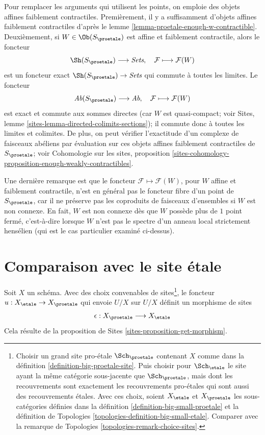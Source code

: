 \medskip\noindent
Pour remplacer les arguments qui utilisent les points, on emploie des objets affines
faiblement contractiles.
Premièrement, il y a suffisamment d'objets affines faiblement contractiles d'après le
lemme \ref{lemma-proetale-enough-w-contractible}.
Deuxièmement, si $W \in \Ob(S_\proetale)$ est affine et faiblement contractile,
alors le foncteur
$$
\Sh(S_\proetale) \longrightarrow \textit{Sets},\quad
\mathcal{F} \longmapsto \mathcal{F}(W)
$$
est un foncteur exact $\Sh(S_\proetale) \to \textit{Sets}$ qui commute
à toutes les limites. Le foncteur
$$
\textit{Ab}(S_\proetale) \longrightarrow \textit{Ab},\quad
\mathcal{F} \longmapsto \mathcal{F}(W)
$$
est exact et commute aux sommes directes (car $W$ est quasi-compact; voir
Sites, lemme \ref{sites-lemma-directed-colimits-sections}); il
commute donc à toutes les limites et colimites. De plus, on peut vérifier l'exactitude d'un
complexe de faisceaux abéliens par évaluation sur ces objets affines
faiblement contractiles de $S_\proetale$; voir
Cohomologie sur les sites, proposition
\ref{sites-cohomology-proposition-enough-weakly-contractibles}.

\medskip\noindent
Une dernière remarque est que le foncteur $\mathcal{F} \mapsto \mathcal{F}(W)$,
pour $W$ affine et faiblement contractile, n'est en général pas le foncteur fibre d'un
point de $S_\proetale$, car il ne préserve pas les coproduits de faisceaux
d'ensembles si $W$ est non connexe. En fait, $W$ est non connexe dès que $W$
possède plus de $1$ point fermé, c'est-à-dire lorsque $W$ n'est pas le spectre d'un
anneau local strictement hensélien (qui est le cas particulier examiné ci-dessus).





\section{Comparaison avec le site \'etale}
\label{section-comparison}

\noindent
Soit $X$ un schéma. Avec des choix convenables de sites\footnote{Choisir
un grand site pro-\'etale $\Sch_\proetale$ contenant $X$ comme dans la
définition \ref{definition-big-proetale-site}. Puis choisir pour $\Sch_\etale$
le site ayant la même catégorie sous-jacente que $\Sch_\proetale$, mais
dont les recouvrements sont exactement les recouvrements pro-\'etales qui sont aussi des
recouvrements \'etales. Avec ces choix, soient $X_\etale$ et $X_\proetale$
les sous-catégories définies dans la
définition \ref{definition-big-small-proetale} et la
définition de Topologies \ref{topologies-definition-big-small-etale}.
Comparer avec la
remarque de Topologies \ref{topologies-remark-choice-sites}.},
le foncteur $u : X_\etale \to X_\proetale$ qui envoie
$U/X$ sur $U/X$ définit un morphisme de sites
$$
\epsilon : X_\proetale \longrightarrow X_\etale
$$
Cela résulte de la proposition de Sites \ref{sites-proposition-get-morphism}.

